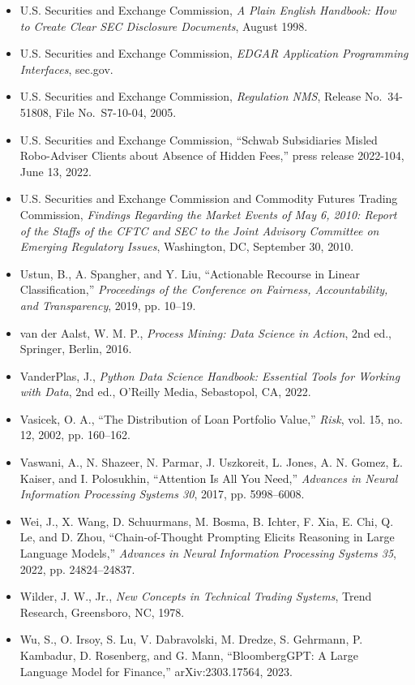 \documentclass{book}
\begin{document}
\begin{itemize}
    \item U.S. Securities and Exchange Commission, \emph{A Plain English Handbook: How to Create Clear SEC Disclosure Documents}, August 1998.
    \item U.S. Securities and Exchange Commission, \emph{EDGAR Application Programming Interfaces}, sec.gov.
    \item U.S. Securities and Exchange Commission, \emph{Regulation NMS}, Release No.\ 34-51808, File No.\ S7-10-04, 2005.
    \item U.S. Securities and Exchange Commission, ``Schwab Subsidiaries Misled Robo-Adviser Clients about Absence of Hidden Fees,'' press release 2022-104, June 13, 2022.
    \item U.S. Securities and Exchange Commission and Commodity Futures Trading Commission, \emph{Findings Regarding the Market Events of May 6, 2010: Report of the Staffs of the CFTC and SEC to the Joint Advisory Committee on Emerging Regulatory Issues}, Washington, DC, September 30, 2010.
    \item Ustun, B., A. Spangher, and Y. Liu, ``Actionable Recourse in Linear Classification,'' \emph{Proceedings of the Conference on Fairness, Accountability, and Transparency}, 2019, pp. 10--19.
    \item van der Aalst, W. M. P., \emph{Process Mining: Data Science in Action}, 2nd ed., Springer, Berlin, 2016.
    \item VanderPlas, J., \emph{Python Data Science Handbook: Essential Tools for Working with Data}, 2nd ed., O'Reilly Media, Sebastopol, CA, 2022.
    \item Vasicek, O. A., ``The Distribution of Loan Portfolio Value,'' \emph{Risk}, vol. 15, no. 12, 2002, pp. 160--162.
    \item Vaswani, A., N. Shazeer, N. Parmar, J. Uszkoreit, L. Jones, A. N. Gomez, {\L}. Kaiser, and I. Polosukhin, ``Attention Is All You Need,'' \emph{Advances in Neural Information Processing Systems 30}, 2017, pp. 5998--6008.
    \item Wei, J., X. Wang, D. Schuurmans, M. Bosma, B. Ichter, F. Xia, E. Chi, Q. Le, and D. Zhou, ``Chain-of-Thought Prompting Elicits Reasoning in Large Language Models,'' \emph{Advances in Neural Information Processing Systems 35}, 2022, pp. 24824--24837.
    \item Wilder, J. W., Jr., \emph{New Concepts in Technical Trading Systems}, Trend Research, Greensboro, NC, 1978.
    \item Wu, S., O. Irsoy, S. Lu, V. Dabravolski, M. Dredze, S. Gehrmann, P. Kambadur, D. Rosenberg, and G. Mann, ``BloombergGPT: A Large Language Model for Finance,'' arXiv:2303.17564, 2023.

\end{itemize}
\end{document}
